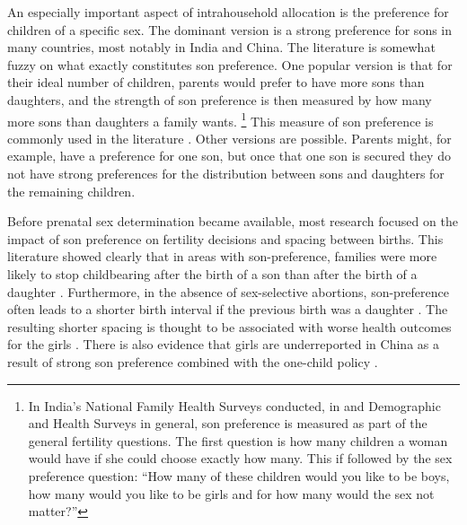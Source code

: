 \documentclass[letterpaper,12pt]{article}
\begin{document}
An especially important aspect of intrahousehold allocation is the
preference for children of a specific sex.
The dominant version is a strong preference for sons in many countries,
most notably in India and China.
The literature is somewhat fuzzy on what exactly constitutes son
preference.
One popular version is that for their ideal number of children, parents
would prefer to have more sons than daughters, and the strength of son
preference is then measured by how many more sons than daughters a
family wants.%
\footnote{
In India's National Family Health Surveys conducted, in and Demographic 
and Health Surveys in general, son preference is measured as part 
of the general fertility questions.
The first question is how many children a woman would have if she could 
choose exactly how many.
This if followed by the sex preference question:
``How many of these children would you like to be boys, how many would you 
like to be girls and for how many would the sex not matter?''
}
This measure of son preference is commonly used in the literature
\citep[e.g.]{clark00,Jensen2009,Hu2015}.
Other versions are possible.
Parents might, for example, have a preference for one son, but once that
one son is secured they do not have strong preferences for the
distribution between sons and daughters for the remaining children.

Before prenatal sex determination became available, most research
focused on the impact of son preference on fertility decisions and
spacing between births.
This literature showed clearly that in areas with son-preference,
families were more likely to stop childbearing after the birth of a son
than after the birth of a daughter \citep[see, for
example,][]{Das1987,Arnold1997,clark00,filmer09}.
Furthermore, in the absence of sex-selective abortions, son-preference
often leads to a shorter birth interval if the previous birth was a
daughter \citep[see, for
example,][]{Das1987,Rahman1993,Pong1994,Haughton1996,Arnold1997}.
The resulting shorter spacing is thought to be associated with worse
health outcomes for the girls
\citep{arnold98,Whitworth2002,Rutstein2005,Conde-Agudelo2006}.
There is also evidence that girls are underreported in China as a result
of strong son preference combined with the one-child policy
\citep{Merli2000}.
\end{document}
